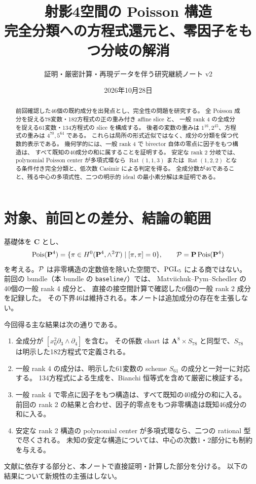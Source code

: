 \documentclass[11pt,a4paper]{ltjsarticle}
\title{射影4空間の Poisson 構造\\[3mm]\large 完全分類への方程式還元と、零因子をもつ分岐の解消}
\author{証明・厳密計算・再現データを伴う研究継続ノート v2}
\date{2026年10月28日}
\newcommand{\PP}{\mathbf P}\renewcommand{\AA}{\mathbf A}\newcommand{\CC}{\mathbf C}\newcommand{\QQ}{\mathbf Q}
\DeclareMathOperator{\Pois}{Pois}\DeclareMathOperator{\rank}{rank}\DeclareMathOperator{\Spec}{Spec}
\DeclareMathOperator{\Rat}{Rat}\DeclareMathOperator{\Log}{Log}\DeclareMathOperator{\Aff}{Aff}
\theoremstyle{remark}\newtheorem{remark}[theorem]{注意}\renewcommand{\proofname}{証明}
\begin{document}
\maketitle
\begin{abstract}
前回確認した46個の既約成分を出発点とし、完全性の問題を研究する。
全 Poisson 成分を捉える78変数・182方程式の正の重み付き affine slice と、
一般 rank 4 の全成分を捉える61変数・134方程式の slice を構成する。
後者の変数の重みは $1^{16},2^{45}$、方程式の重みは $4^{70},5^{64}$ である。
これらは局所の形式近似ではなく、成分の分類を保つ代数的表示である。
幾何学的には、一般 rank 4 で bivector 自体の零点に因子をもつ構造は、
すべて既知の40成分の和に属することを証明する。
安定な rank 2 分岐では、polynomial Poisson center が多項式環なら
$\Rat(1,1,3)$ または $\Rat(1,2,2)$ となる条件付き完全分類と、低次数 Casimir による判定を得る。
全成分数が46であること、残る中心の多項式性、二つの明示的 ideal の最小素分解は未証明である。
\end{abstract}
\tableofcontents

\section{対象、前回との差分、結論の範囲}
基礎体を $\CC$ とし、
\[
 \Pois(\PP^4)=\{\pi\in H^0(\PP^4,\wedge^2T)\mid[\pi,\pi]=0\},
 \qquad \cP=\PP\Pois(\PP^4)
\]
を考える。$\mathcal P$ は非零構造の定数倍を除いた空間で、$\operatorname{PGL}_5$ による商ではない。
前回の bundle（本 bundle の \texttt{baseline/}）では、
Matviichuk--Pym--Schedler \cite[Theorem 1.4]{MPS} の40個の一般 rank 4 成分と、
直接の接空間計算で確認した6個の一般 rank 2 成分を記録した。
その下界46は維持される。本ノートは追加成分の存在を主張しない。

今回得る主な結果は次の通りである。
\begin{enumerate}
 \item 全成分が $[x_0^2\partial_3\wedge\partial_4]$ を含む。
 その係数 chart は $\AA^8\times S_{78}$ と同型で、$S_{78}$ は明示した182方程式で定義される。
 \item 一般 rank 4 の成分は、明示した61変数の scheme $S_{61}$ の成分と一対一に対応する。
 134方程式による生成を、Bianchi 恒等式を含めて厳密に検証する。
 \item 一般 rank 4 で零点に因子をもつ構造は、すべて既知の40成分の和に入る。
 前回の rank 2 の結果と合わせ、因子的零点をもつ非零構造は既知46成分の和に入る。
 \item 安定な rank 2 構造の polynomial center が多項式環なら、二つの rational 型で尽くされる。
 未知の安定な構造については、中心の次数1・2部分にも制約を与える。
\end{enumerate}
文献に依存する部分と、本ノートで直接証明・計算した部分を分ける。
以下の結果について新規性の主張はしない。
\end{document}
